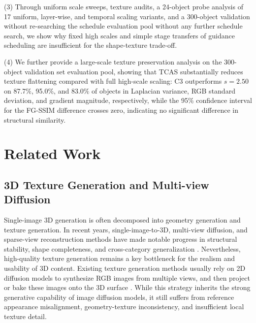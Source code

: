 \documentclass[times,twocolumn,final]{elsarticle}
\providecommand{\DIFadd}[1]{{\protect\color{blue} \sf #1}} %
\providecommand{\DIFdel}[1]{{\protect\color{red} \scriptsize #1}} %
\providecommand{\DIFaddbegin}{} %
\providecommand{\DIFaddend}{} %
\providecommand{\DIFdelbegin}{} %
\providecommand{\DIFdelend}{} %
\newcommand{\DIFscaledelfig}{0.5}
\newlength{\DIFdelgraphicswidth} %
\newlength{\DIFdelgraphicsheight} %
\newcommand{\DIFaddincludegraphics}[2][]{{\color{blue}\fbox{\DIFOincludegraphics[#1]{#2}}}} %
\newcommand{\DIFdelincludegraphics}[2][]{%
\sbox{\DIFdelgraphicsbox}{\DIFOincludegraphics[#1]{#2}}%
\settoboxwidth{\DIFdelgraphicswidth}{\DIFdelgraphicsbox} %
\settoboxtotalheight{\DIFdelgraphicsheight}{\DIFdelgraphicsbox} %
\scalebox{\DIFscaledelfig}{%
\parbox[b]{\DIFdelgraphicswidth}{\usebox{\DIFdelgraphicsbox}\\[-\baselineskip] \rule{\DIFdelgraphicswidth}{0em}}\llap{\resizebox{\DIFdelgraphicswidth}{\DIFdelgraphicsheight}{%
\setlength{\unitlength}{\DIFdelgraphicswidth}%
\begin{picture}(1,1)%
\thicklines\linethickness{2pt} %
{\color[rgb]{1,0,0}\put(0,0){\framebox(1,1){}}}%
{\color[rgb]{1,0,0}\put(0,0){\line( 1,1){1}}}%
{\color[rgb]{1,0,0}\put(0,1){\line(1,-1){1}}}%
\end{picture}%
}\hspace*{3pt}}} %
} %
\DeclareRobustCommand{\DIFaddbegin}{\DIFOaddbegin \let\includegraphics\DIFaddincludegraphics} %
\DeclareRobustCommand{\DIFaddend}{\DIFOaddend \let\includegraphics\DIFOincludegraphics} %
\DeclareRobustCommand{\DIFdelbegin}{\DIFOdelbegin \let\includegraphics\DIFdelincludegraphics} %
\DeclareRobustCommand{\DIFdelend}{\DIFOaddend \let\includegraphics\DIFOincludegraphics} %
\begin{document}
(3) Through uniform scale sweeps, texture audits, a 24-object probe analysis of 17 uniform, layer-wise, and temporal scaling variants, and a 300-object \DIFdelbegin \DIFdel{validation without re-searching the schedule }\DIFdelend \DIFaddbegin \DIFadd{evaluation pool without any further schedule search}\DIFaddend , we show why fixed high scales and simple stage transfers of guidance scheduling are insufficient for the shape-texture trade-off.

(4) We further provide a large-scale texture preservation analysis on the 300-object \DIFdelbegin \DIFdel{validation set}\DIFdelend \DIFaddbegin \DIFadd{evaluation pool}\DIFaddend , showing that TCAS substantially reduces texture flattening compared with full high-scale scaling: C3 outperforms $s = 2.50$ on 87.7\%, 95.0\%, and 83.0\% of objects in Laplacian variance, RGB standard deviation, and gradient magnitude, respectively, while the 95\% confidence interval for the FG-SSIM difference crosses zero, indicating no significant difference in structural similarity.

\section{Related Work}
\label{sec:related}

\subsection{3D Texture Generation and Multi-view Diffusion}
\label{subsec:3dtex}

Single-image 3D generation is often decomposed into geometry generation and texture generation. In recent years, single-image-to-3D, multi-view diffusion, and sparse-view reconstruction methods have made notable progress in structural stability, shape completeness, and cross-category generalization \cite{liu2023zero1to3,shi2023zero123pp,liu2023syncdreamer,long2023wonder3d,shi2024mvdream,wang2023imagedream,xu2024instantmesh,ke2024era3d}. Nevertheless, high-quality texture generation remains a key bottleneck for the realism and usability of 3D content. Existing texture generation methods usually rely on 2D diffusion models to synthesize RGB images from multiple views, and then project or bake these images onto the 3D surface \cite{chen2023text2tex,richardson2023texture,poole2023dreamfusion,chen2023fantasia3d}. While this strategy inherits the strong generative capability of image diffusion models, it still suffers from reference appearance misalignment, geometry-texture inconsistency, and insufficient local texture detail.
\end{document}

